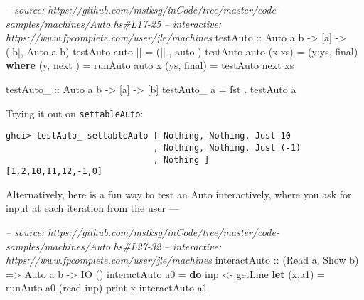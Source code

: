 \documentclass[]{article}
\newenvironment{Shaded}{}{}
\newcommand{\KeywordTok}[1]{\textcolor[rgb]{0.00,0.44,0.13}{\textbf{{#1}}}}
\newcommand{\DataTypeTok}[1]{\textcolor[rgb]{0.56,0.13,0.00}{{#1}}}
\newcommand{\CommentTok}[1]{\textcolor[rgb]{0.38,0.63,0.69}{\textit{{#1}}}}
\newcommand{\OtherTok}[1]{\textcolor[rgb]{0.00,0.44,0.13}{{#1}}}
\newcommand{\FunctionTok}[1]{\textcolor[rgb]{0.02,0.16,0.49}{{#1}}}
\newcommand{\NormalTok}[1]{{#1}}
\begin{document}
\begin{Shaded}
\begin{Highlighting}[]
\CommentTok{-- source: https://github.com/mstksg/inCode/tree/master/code-samples/machines/Auto.hs#L17-25}
\CommentTok{-- interactive: https://www.fpcomplete.com/user/jle/machines}
\OtherTok{testAuto ::} \DataTypeTok{Auto} \NormalTok{a b }\OtherTok{->} \NormalTok{[a] }\OtherTok{->} \NormalTok{([b], }\DataTypeTok{Auto} \NormalTok{a b)}
\NormalTok{testAuto auto []      }\FunctionTok{=} \NormalTok{([]  , auto )}
\NormalTok{testAuto auto (x}\FunctionTok{:}\NormalTok{xs)  }\FunctionTok{=} \NormalTok{(y}\FunctionTok{:}\NormalTok{ys, final)}
  \KeywordTok{where}
    \NormalTok{(y,  next ) }\FunctionTok{=} \NormalTok{runAuto  auto x}
    \NormalTok{(ys, final) }\FunctionTok{=} \NormalTok{testAuto next xs}

\OtherTok{testAuto_ ::} \DataTypeTok{Auto} \NormalTok{a b }\OtherTok{->} \NormalTok{[a] }\OtherTok{->} \NormalTok{[b]}
\NormalTok{testAuto_ a }\FunctionTok{=} \NormalTok{fst }\FunctionTok{.} \NormalTok{testAuto a}
\end{Highlighting}
\end{Shaded}

Trying it out on \texttt{settableAuto}:

\begin{verbatim}
ghci> testAuto_ settableAuto [ Nothing, Nothing, Just 10
                             , Nothing, Nothing, Just (-1)
                             , Nothing ]
[1,2,10,11,12,-1,0]
\end{verbatim}

Alternatively, here is a fun way to test an Auto interactively, where
you ask for input at each iteration from the user ---

\begin{Shaded}
\begin{Highlighting}[]
\CommentTok{-- source: https://github.com/mstksg/inCode/tree/master/code-samples/machines/Auto.hs#L27-32}
\CommentTok{-- interactive: https://www.fpcomplete.com/user/jle/machines}
\OtherTok{interactAuto ::} \NormalTok{(}\DataTypeTok{Read} \NormalTok{a, }\DataTypeTok{Show} \NormalTok{b) }\OtherTok{=>} \DataTypeTok{Auto} \NormalTok{a b }\OtherTok{->} \DataTypeTok{IO} \NormalTok{()}
\NormalTok{interactAuto a0 }\FunctionTok{=} \KeywordTok{do}
    \NormalTok{inp }\OtherTok{<-} \NormalTok{getLine}
    \KeywordTok{let} \NormalTok{(x,a1) }\FunctionTok{=} \NormalTok{runAuto a0 (read inp)}
    \NormalTok{print x}
    \NormalTok{interactAuto a1}
\end{Highlighting}
\end{Shaded}
\end{document}
